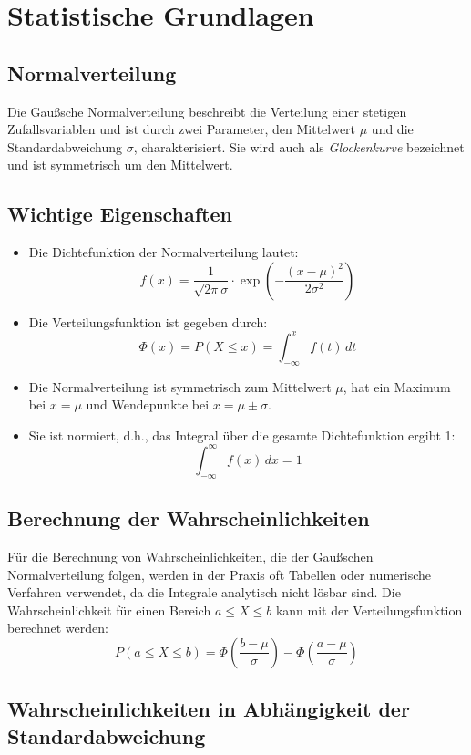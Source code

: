 \section{Statistische Grundlagen}
\label{sec:statistische_grundlagen}

\subsection{Normalverteilung}
\label{sec:normal_distribution}
Die Gaußsche Normalverteilung beschreibt die Verteilung einer stetigen Zufallsvariablen und ist durch zwei Parameter, den Mittelwert $\mu$ und die Standardabweichung $\sigma$, charakterisiert. Sie wird auch als \textit{Glockenkurve} bezeichnet und ist symmetrisch um den Mittelwert.

\subsection*{Wichtige Eigenschaften}
\begin{itemize}
    \item Die Dichtefunktion der Normalverteilung lautet:
    \[
    f(x) = \frac{1}{\sqrt{2 \pi} \sigma} \cdot \exp\left(-\frac{(x - \mu)^2}{2 \sigma^2}\right)
    \]
    \item Die Verteilungsfunktion ist gegeben durch:
    \[
    \Phi(x) = P(X \leq x) = \int_{-\infty}^{x} f(t) \, dt
    \]
    \item Die Normalverteilung ist symmetrisch zum Mittelwert $\mu$, hat ein Maximum bei $x = \mu$ und Wendepunkte bei $x = \mu \pm \sigma$.
    \item Sie ist normiert, d.h., das Integral über die gesamte Dichtefunktion ergibt 1:
    \[
    \int_{-\infty}^{\infty} f(x) \, dx = 1
    \]
\end{itemize}

\subsection*{Berechnung der Wahrscheinlichkeiten}
Für die Berechnung von Wahrscheinlichkeiten, die der Gaußschen Normalverteilung folgen, werden in der Praxis oft Tabellen oder numerische Verfahren verwendet, da die Integrale analytisch nicht lösbar sind. Die Wahrscheinlichkeit für einen Bereich $a \leq X \leq b$ kann mit der Verteilungsfunktion berechnet werden:
\[
P(a \leq X \leq b) = \Phi\left(\frac{b - \mu}{\sigma}\right) - \Phi\left(\frac{a - \mu}{\sigma}\right)
\]

\subsection*{Wahrscheinlichkeiten in Abhängigkeit der Standardabweichung}


